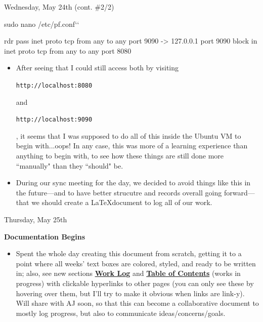 \documentclass[11pt]{article}
\newcommand\codebox[1]{
    \noindent\hspace{-0.25em}\begin{tcolorbox}[on line, hbox, colback = codeblack, colframe = codeborder, coltext = white, boxrule = 1.5pt, left = 2pt, right = 2pt, top = 0.5pt, bottom = 0.5pt]
    \small\texttt{#1}\normalsize
    \end{tcolorbox}\hspace{-0.25em}
}
\newcommand{\StartConsole}{\gdef\MyMacTerminalPrompt{}}
\begin{document}
\begin{redbox}{Wednesday, May 24th (cont. \#2/2)\vspace{-2em}\begin{flushright}\large{}\end{flushright}}
    \begin{MacTerminal}
 sudo nano /etc/pf.conf`\StartConsole`

rdr pass inet proto tcp from any to any port 9090 -> 127.0.0.1 port 9090
block in inet proto tcp from any to any port 8080
    \end{MacTerminal}
\begin{itemize}
    \begin{itemize}
        \item After saving changes and exiting, I enabled \codebox{pf} by running \codebox{sudo pfctl -e}.
    \end{itemize}
    \item After seeing that I could still access both by visiting \codebox{http://localhost:8080} and \codebox{http://localhost:9090}, it seems that I was supposed to do all of this inside the Ubuntu VM to begin with...oops! In any case, this was more of a learning experience than anything to begin with, to see how these things are still done more ``manually" than they ``should" be. 
    \item During our sync meeting for the day, we decided to avoid things like this in the future---and to have better strucutre and records overall going forward---that we should create a \LaTeX document to log all of our work.
\end{itemize}
\end{redbox}

\begin{center}
\hspace{0.2cm}
\vspace{-0.5em}
\end{center}

\begin{redbox}{Thursday, May 25th\vspace{-2em}\begin{flushright}\large\textbf{Documentation Begins} \end{flushright}}
\begin{itemize}
    \item Spent the whole day creating this document from scratch, getting it to a point where all weeks' text boxes are colored, styled, and ready to be written in; also, see new sections \hyperlink{page.1}{\textbf{Work Log}} and \hyperlink{page.1}{\textbf{Table of Contents}} (works in progress) with clickable hyperlinks to other pages (you can only see these by hovering over them, but I'll try to make it obvious when links are link-y). Will share with AJ soon, so that this can become a collaborative document to mostly log progress, but also to communicate ideas/concerns/goals.
\end{itemize}
\end{redbox}
\end{document}
